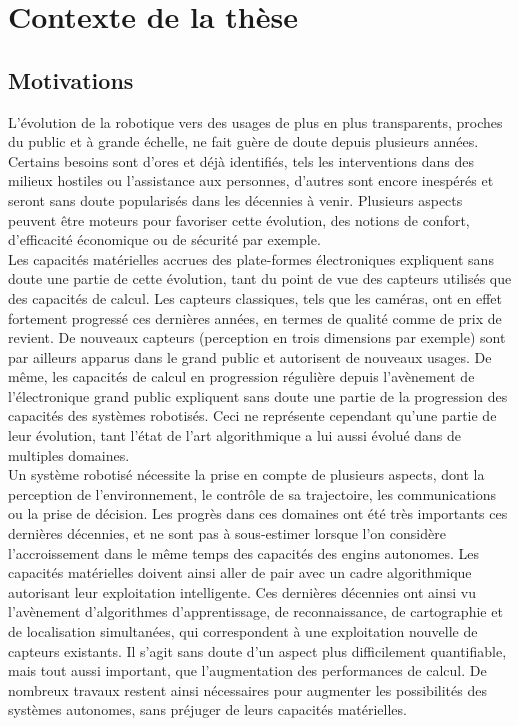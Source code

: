 \vspace{10pt}

\minitoc
\clearpage

\section{Contexte de la thèse}
\subsection{Motivations}
L'évolution de la robotique vers des usages de plus en plus transparents, proches du public et à grande échelle, ne fait guère de doute depuis plusieurs années. Certains besoins sont d'ores et déjà identifiés, tels les interventions dans des milieux hostiles ou l'assistance aux personnes, d'autres sont encore inespérés et seront sans doute popularisés dans les décennies à venir. Plusieurs aspects peuvent être moteurs pour favoriser cette évolution, des notions de confort, d'efficacité économique ou de sécurité par exemple.\\

Les capacités matérielles accrues des plate-formes électroniques expliquent sans doute une partie de cette évolution, tant du point de vue des capteurs utilisés que des capacités de calcul. Les capteurs classiques, tels que les caméras, ont en effet fortement progressé ces dernières années, en termes de qualité comme de prix de revient. De nouveaux capteurs (perception en trois dimensions par exemple) sont par ailleurs apparus dans le grand public et autorisent de nouveaux usages. De même, les capacités de calcul en progression régulière depuis l'avènement de l'électronique grand public expliquent sans doute une partie de la progression des capacités des systèmes robotisés. Ceci ne représente cependant qu'une partie de leur évolution, tant l'état de l'art algorithmique a lui aussi évolué dans de multiples domaines.\\

Un système robotisé nécessite la prise en compte de plusieurs aspects, dont la perception de l'environnement, le contrôle de sa trajectoire, les communications ou la prise de décision. Les progrès dans ces domaines ont été très importants ces dernières décennies, et ne sont pas à sous-estimer lorsque l'on considère l'accroissement dans le même temps des capacités des engins autonomes. Les capacités matérielles doivent ainsi aller de pair avec un cadre algorithmique autorisant leur exploitation intelligente. Ces dernières décennies ont ainsi vu l'avènement d'algorithmes d'apprentissage, de reconnaissance, de cartographie et de localisation simultanées, qui correspondent à une exploitation nouvelle de capteurs existants. Il s'agit sans doute d'un aspect plus difficilement quantifiable, mais tout aussi important, que l'augmentation des performances de calcul. De nombreux travaux restent ainsi nécessaires pour augmenter les possibilités des systèmes autonomes, sans préjuger de leurs capacités matérielles.\\


